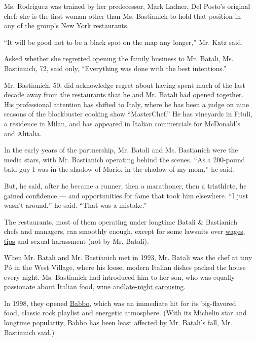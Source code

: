 Ms. Rodriguez was trained by her predecessor, Mark Ladner, Del Posto's
original chef; she is the first woman other than Ms. Bastianich to hold
that position in any of the group's New York restaurants.

``It will be good not to be a black spot on the map any longer,'' Mr.
Katz said.

Asked whether she regretted opening the family business to Mr. Batali,
Ms. Bastianich, 72, said only, ``Everything was done with the best
intentions.''

Mr. Bastianich, 50, did acknowledge regret about having spent much of
the last decade away from the restaurants that he and Mr. Batali had
opened together. His professional attention has shifted to Italy, where
he has been a judge on nine seasons of the blockbuster cooking show
``MasterChef.'' He has vineyards in Friuli, a residence in Milan, and
has appeared in Italian commercials for McDonald's and Alitalia.

In the early years of the partnership, Mr. Batali and Ms. Bastianich
were the media stars, with Mr. Bastianich operating behind the scenes.
``As a 200-pound bald guy I was in the shadow of Mario, in the shadow of
my mom,'' he said.

But, he said, after he became a runner, then a marathoner, then a
triathlete, he gained confidence --- and opportunities for fame that
took him elsewhere. ``I just wasn't around,'' he said. ``That was a
mistake.''

The restaurants, most of them operating under longtime Batali \&
Bastianich chefs and managers, ran smoothly enough, except for some
lawsuits over
\href{https://dinersjournal.blogs.nytimes3xbfgragh.onion/2012/09/24/del-posto-to-pay-1-15-million-to-settle-workers-suit/}{wages,
tips} and sexual harassment (not by Mr. Batali).

When Mr. Batali and Mr. Bastianich met in 1993, Mr. Batali was the chef
at tiny Pó in the West Village, where his loose, modern Italian dishes
packed the house every night. Ms. Bastianich had introduced him to her
son, who was equally passionate about Italian food, wine
and\href{https://www.vanityfair.com/culture/2012/04/joe-bastianich-restaurant-man-book-excerpt-mario-batali-stoned-babbo}{late-night
carousing}.

In 1998, they opened
\href{https://www.nytimes3xbfgragh.onion/1998/08/26/dining/restaurants-a-radical-departure-with-sure-footing.html}{Babbo},
which was an immediate hit for its big-flavored food, classic rock
playlist and energetic atmosphere. (With its Michelin star and longtime
popularity, Babbo has been least affected by Mr. Batali's fall, Mr.
Bastianich said.)

